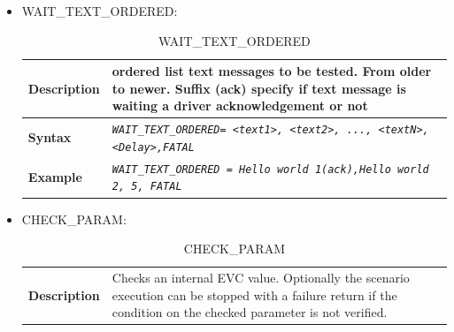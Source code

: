 \begin{itemize}
		\item WAIT\_TEXT\_ORDERED:

		\begin{longtable}{|l|l|}
			\caption{WAIT\_TEXT\_ORDERED}\\
			\hline

				\begin{minipage}[t]{0.22\linewidth} \textbf{Description} \end{minipage}
			&	\begin{minipage}[t]{0.78\linewidth}ordered list text messages to be tested. From older to newer. 
Suffix (ack) specify if text message is waiting a driver acknowledgement or not \end{minipage} \\

			\hline

				\begin{minipage}[t]{0.22\linewidth} \textbf{Syntax}	\end{minipage}
			&	\begin{minipage}[t]{0.78\linewidth} \emph{\texttt{WAIT\_TEXT\_ORDERED= <text1>, <text2>, ..., <textN>, <Delay>,FATAL}} \end{minipage} \\

			\hline\hline

			\hline

				\begin{minipage}[t]{0.22\linewidth} \textbf{Example}	\end{minipage}
			&	\begin{minipage}[t]{0.78\linewidth} \emph{\texttt{WAIT\_TEXT\_ORDERED = Hello world 1(ack),Hello world 2, 5, FATAL}} \end{minipage} \\

			\hline\hline

		\end{longtable}

	\item CHECK\_PARAM:

		\begin{longtable}{|l|l|l|}
			\caption{CHECK\_PARAM}\\
			\hline

				\begin{minipage}[t]{0.22\linewidth} \textbf{Description} \end{minipage}
			&	\multicolumn{2}{l|}{ \begin{minipage}[t]{0.78\linewidth} Checks an internal EVC value. Optionally the scenario execution can be stopped with a failure return if the condition on the checked parameter is not verified. \end{minipage} } \\


\end{longtable}
\end{itemize}
